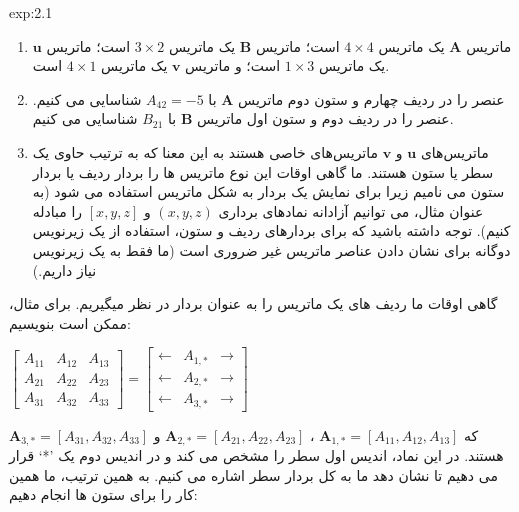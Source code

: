 {\begin{spacing}{1.5}
\begin{example}{exp:2.1}
            \begin{enumerate}[label=\textbf{\arabic*}.]
                \item {ماتریس $\textbf{A}$ یک ماتریس $4\times 4$ است؛
                ماتریس $\textbf{B}$ یک ماتریس $3\times 2$ است؛
                ماتریس $\textbf{u}$ یک ماتریس $1\times 3$ است؛
                و ماتریس $\textbf{v}$ یک ماتریس $4\times 1$ است.}
                \item {عنصر را در ردیف چهارم و ستون دوم ماتریس $\textbf{A}$ با $A_{42}=-5$ شناسایی می کنیم. عنصر را در ردیف دوم و ستون اول ماتریس $\textbf{B}$ با $B_{21}$ شناسایی می کنیم.}
                \item {ماتریس‌های $\textbf{u}$ و $\textbf{v}$ ماتریس‌های خاصی هستند به این معنا که به ترتیب حاوی یک سطر یا ستون هستند.
                ما گاهی اوقات این نوع ماتریس ها را بردار ردیف یا بردار ستون می نامیم زیرا برای نمایش یک بردار به شکل ماتریس استفاده می شود
                    (به عنوان مثال، می توانیم آزادانه نمادهای برداری $(x, y, z)$ و $[x, y, z]$ را مبادله کنیم).
                    توجه داشته باشید که برای بردارهای ردیف و ستون، استفاده از یک زیرنویس دوگانه برای نشان دادن عناصر ماتریس غیر ضروری است (ما فقط به یک زیرنویس نیاز داریم.)}
            \end{enumerate}
            گاهی اوقات ما ردیف های یک ماتریس را به عنوان بردار در نظر میگیریم. برای مثال، ممکن است بنویسیم:

            $\begin{bmatrix}
                 A_{11} & A_{12} & A_{13} \\
                 A_{21} & A_{22} & A_{23} \\
                 A_{31} & A_{32} & A_{33}
            \end{bmatrix}=\begin{bmatrix}
                              \leftarrow & A_{1,*} & \rightarrow \\
                              \leftarrow & A_{2,*} & \rightarrow \\
                              \leftarrow & A_{3,*} & \rightarrow
            \end{bmatrix}$

            که $\textbf{A}_{1,*}=[A_{11},A_{12},A_{13}]$ ، $\textbf{A}_{2,*}=[A_{21},A_{22},A_{23}]$ و $\textbf{A}_{3,*}=[A_{31},A_{32},A_{33}]$ هستند.
            در این نماد، اندیس اول سطر را مشخص می کند و در اندیس دوم یک ’*‘ قرار می دهیم تا نشان دهد ما به کل بردار سطر اشاره می کنیم. به همین ترتیب، ما همین کار را برای ستون ها انجام دهیم:


\end{example}
\end{spacing}}
